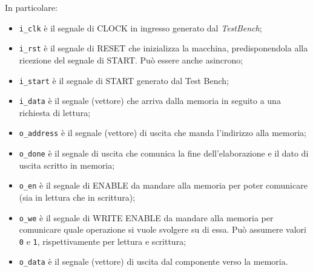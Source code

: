 \documentclass{article}
\begin{document}
In particolare:
\begin{itemize}
    \item   \texttt{i\_clk} è il segnale di CLOCK in ingresso generato dal \emph{TestBench};
    \item   \texttt{i\_rst} è il segnale di RESET che inizializza la macchina, predisponendola alla ricezione del segnale di START. Può essere anche asincrono;
    \item   \texttt{i\_start} è il segnale di START generato dal Test Bench;
    \item   \texttt{i\_data} è il segnale (vettore) che arriva dalla memoria in seguito a una richiesta di lettura;
    \item   \texttt{o\_address} è il segnale (vettore) di uscita che manda l’indirizzo alla memoria;
    \item   \texttt{o\_done} è il segnale di uscita che comunica la fine dell’elaborazione e il dato di uscita scritto in memoria;
    \item   \texttt{o\_en} è il segnale di ENABLE da mandare alla memoria per poter comunicare (sia in lettura che in scrittura);
    \item   \texttt{o\_we} è il segnale di WRITE ENABLE da mandare alla memoria per comunicare quale operazione si vuole svolgere su di essa. Può assumere valori \texttt{0} e \texttt{1}, rispettivamente per lettura e scrittura;
    \item   \texttt{o\_data} è il segnale (vettore) di uscita dal componente verso la memoria.
\end{itemize}

\pagebreak
\end{document}

